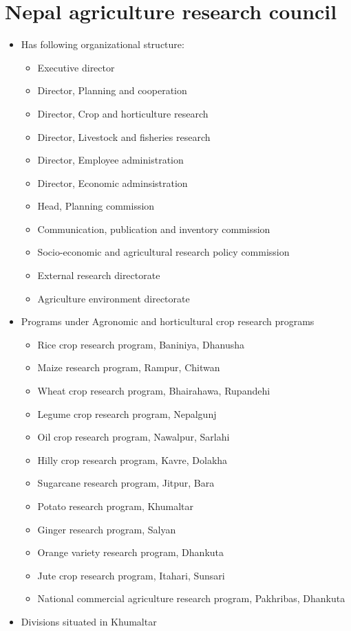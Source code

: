 \documentclass[
  openany]{book}
\providecommand{\tightlist}{%
  \setlength{\itemsep}{0pt}\setlength{\parskip}{0pt}}
\begin{document}
\hypertarget{nepal-agriculture-research-council}{%
\section{Nepal agriculture research council}\label{nepal-agriculture-research-council}}

\begin{itemize}
\tightlist
\item
  Has following organizational structure:

  \begin{itemize}
  \tightlist
  \item
    Executive director
  \item
    Director, Planning and cooperation
  \item
    Director, Crop and horticulture research
  \item
    Director, Livestock and fisheries research
  \item
    Director, Employee administration
  \item
    Director, Economic adminsistration
  \item
    Head, Planning commission
  \item
    Communication, publication and inventory commission
  \item
    Socio-economic and agricultural research policy commission
  \item
    External research directorate
  \item
    Agriculture environment directorate
  \end{itemize}
\item
  Programs under Agronomic and horticultural crop research programs

  \begin{itemize}
  \tightlist
  \item
    Rice crop research program, Baniniya, Dhanusha
  \item
    Maize research program, Rampur, Chitwan
  \item
    Wheat crop research program, Bhairahawa, Rupandehi
  \item
    Legume crop research program, Nepalgunj
  \item
    Oil crop research program, Nawalpur, Sarlahi
  \item
    Hilly crop research program, Kavre, Dolakha
  \item
    Sugarcane research program, Jitpur, Bara
  \item
    Potato research program, Khumaltar
  \item
    Ginger research program, Salyan
  \item
    Orange variety research program, Dhankuta
  \item
    Jute crop research program, Itahari, Sunsari
  \item
    National commercial agriculture research program, Pakhribas, Dhankuta
  \end{itemize}
\item
  Divisions situated in Khumaltar


\end{itemize}
\end{document}
